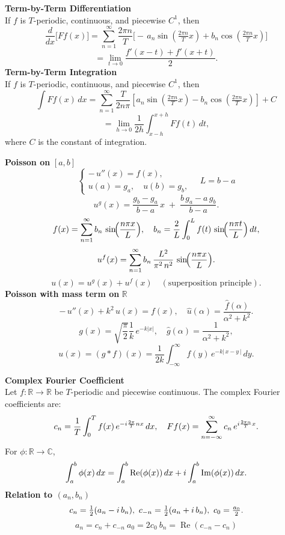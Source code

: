 \documentclass[8pt]{article}
\begin{document}
\begin{multicols}{2}
	\small

	\noindent \textbf{Term-by-Term Differentiation}\\
	If $f$ is $T$-periodic, continuous, and piecewise $C^1$, then
	\[
		\frac{d}{dx}\bigl[Ff(x)\bigr]
		= \sum_{n=1}^\infty \frac{2\pi n}{T}\bigl[-\,a_n\sin(\tfrac{2\pi n}{T}x)
			+b_n\cos(\tfrac{2\pi n}{T}x)\bigr]
	\]
	\[
		= \lim_{t \to 0} \frac{f'(x - t) + f'(x + t)}{2}.
	\]
	\noindent \textbf{Term-by-Term Integration}\\
	If $f$ is $T$-periodic, continuous, and piecewise $C^1$, then
	\[
		\int Ff(x)\,dx
		= \sum_{n=1}^\infty \frac{T}{2 n \pi} \left[ a_n \sin\left(\tfrac{2\pi n}{T}x\right)
			- b_n \cos\left(\tfrac{2\pi n}{T}x\right) \right] + C
	\]
	\[
		= \lim_{h \to 0} \frac{1}{2h} \int_{x - h}^{x + h} Ff(t)\,dt,
	\]
	where $C$ is the constant of integration.

	\noindent \textbf{Poisson on }$[a,b]$
	\[
		\begin{cases}
			-\,u''(x)=f(x), \\[2pt]
			u(a)=g_a,\quad u(b)=g_b,
		\end{cases}
		\quad
		L = b - a
	\]
	\[
		u^g(x)=\frac{g_b-g_a}{b-a}\,x \;+\;\frac{b\,g_a - a\,g_b}{b-a}.
	\]
	\[
		f(x)=\sum_{n=1}^{\infty} b_n \,\sin\!\Bigl(\frac{n\pi x}{L}\Bigr),
		\quad
		b_n=\frac{2}{L}\int_{0}^{L}f(t)\,\sin\!\Bigl(\frac{n\pi t}{L}\Bigr)\,dt,
	\]
	\[
		u^f(x)=\sum_{n=1}^{\infty} b_n \,\frac{L^2}{\pi^2\,n^2}
		\,\sin\!\Bigl(\frac{n\pi x}{L}\Bigr).
	\]
	\[
		u(x)=u^g(x)+u^f(x) \quad (\text{superposition principle}).
	\]
	\noindent \textbf{Poisson with mass term on }$\mathbb{R}$ \vspace{-5px}
	\[
		-\,u''(x)+k^2\,u(x)=f(x),
		\quad
		\widehat{u}(\alpha)=\frac{\widehat{f}(\alpha)}{\alpha^2 + k^2}.
	\]
	\vspace{-5px}
	\[
		g(x)=\sqrt{\frac{\pi}{2}} \frac{1}{k}\,e^{-k|x|},
		\quad
		\widehat{g}(\alpha)=\frac{1}{\alpha^2 + k^2},
	\]
	\vspace{-5px}\[
		u(x)=(g*f)(x)
		=\frac{1}{2k}\!\int_{-\infty}^{\infty} f(y)\,e^{-k|\,x-y\,|}\,dy.
	\]

	\columnbreak

	\noindent \textbf{Complex Fourier Coefficient}\\
	Let \( f : \mathbb{R} \to \mathbb{R} \) be \( T \)-periodic and piecewise continuous.  The complex Fourier coefficients are:
	\[
		c_n = \frac{1}{T} \int_0^T f(x)\, e^{-i \frac{2\pi}{T} n x} \, dx,
		\quad
		Ff(x) = \sum_{n=-\infty}^{\infty} c_{n}\,e^{i\frac{2\pi n}{T}x}.\vspace{-10px}
	\]
	For \( \phi : \mathbb{R} \to \mathbb{C} \), \vspace{-5px}
	\[ \int_a^b \phi(x)\,dx
		= \int_a^b \operatorname{Re}(\phi(x)) \, dx + i \int_a^b \operatorname{Im}(\phi(x)) \, dx. \vspace{-5px}
	\]
	\noindent \textbf{Relation to \( (a_n, b_n) \)}\quad
	\[ \vspace{-5px}
		c_{n} = \tfrac{1}{2}(a_{n} - i\,b_{n}),\
		c_{-n} = \tfrac{1}{2}(a_{n} + i\,b_{n}),\
		c_{0} = \tfrac{a_{0}}{2}.\]\[
		a_{n} = c_n + c_{-n}\
		a_{0} = 2 c_0 \
		b_n = \operatorname{Re}(c_{-n} - c_n)
	\]


\end{multicols}
\end{document}
